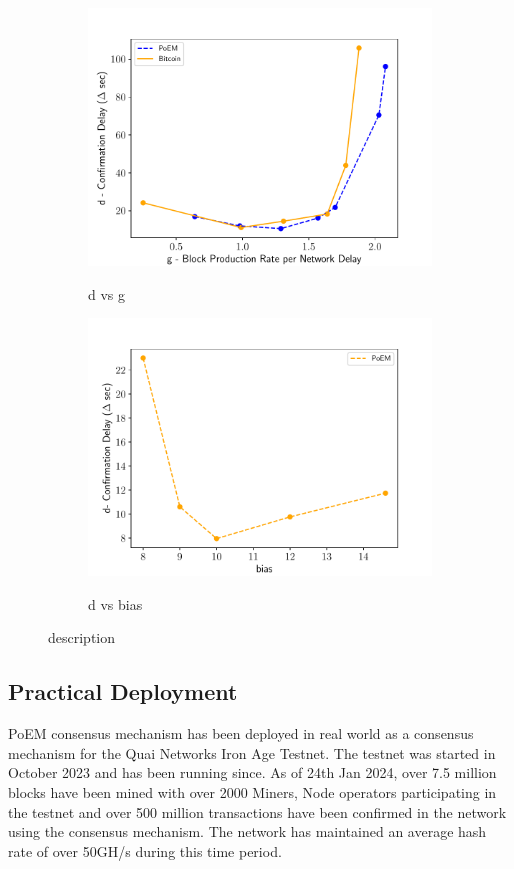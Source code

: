 \begin{figure}
    \centering
    \begin{subfigure}{0.49\textwidth}
    \centering
    \caption{d vs g}
    \includegraphics[width = \textwidth]{figures/dvsg.pdf}
    \label{fig:dvsg}
    \end{subfigure}
    \begin{subfigure}{0.49\textwidth}
    \centering
    \caption{d vs bias}
    \includegraphics[width = \textwidth]{figures/gamma.pdf}
    \label{fig:right}
    \end{subfigure}
    \caption{description}
    \label{fig:gamma}
\end{figure}

\subsection{Practical Deployment}
PoEM consensus mechanism has been deployed in real world as a consensus
mechanism for the Quai Networks Iron Age Testnet. The testnet was started in
October 2023 and has been running since. As of 24th Jan 2024, over 7.5 million
blocks have been mined with over 2000 Miners, Node operators participating in
the testnet and over 500 million transactions have been confirmed in the network
using the consensus mechanism. The network has maintained an average hash rate
of over 50GH/s during this time period.